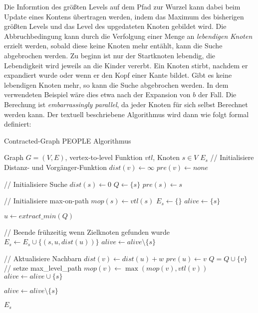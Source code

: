 Die Informtion des größten Levels auf dem Pfad zur Wurzel kann dabei beim Update eines Kontens übertragen werden, indem das Maximum des bisherigen größten Levels und das Level des upgedateten Knoten gebildet wird.
Die Abbruchbedingung kann durch die Verfolgung einer Menge an \emph{lebendigen Knoten} erzielt werden, sobald diese keine Knoten mehr entählt, kann die Suche abgebrochen werden.
Zu beginn ist nur der Startknoten lebendig, die Lebendigkeit wird jeweils an die Kinder vererbt.
Ein Knoten stirbt, nachdem er expandiert wurde oder wenn er den Kopf einer Kante bildet.
Gibt es keine lebendigen Knoten mehr, so kann die Suche abgebrochen werden.
In dem verwendeten Beispiel wäre dies etwa nach der Expansion von $b$ der Fall.
Die Berechung ist \emph{embarrassingly parallel}, da jeder Knoten für sich selbst Berechnet werden kann.
Der textuell beschriebene Algorithmus wird dann wie folgt formal definiert:

\begin{algorithm}[ht]
  \caption{Contracted-Graph PEOPLE Algorithmus}
  \begin{algorithmic}[1]
    \Require Graph $G = (V, E)$, vertex-to-level Funktion ${vtl}$, Knoten $s \in V$
    \Ensure $E_s$
    \State // Initialisiere Distanz- und Vorgänger-Funktion
    \State ${dist}(v) \leftarrow \infty$
    \State ${pre}(v) \leftarrow {none}$
    \EndFor

    \State
    \State // Initialisiere Suche
    \State ${dist}(s) \leftarrow 0$
    \State $Q\leftarrow \{ s \}$
    \State ${pre}(s) \leftarrow s$

    \State
    \State // Initialisiere max-on-path
    \State ${mop}(s) \leftarrow {vtl}(s)$
    \State $E_s \leftarrow \{ \}$
    \State ${alive} \leftarrow \{ s \}$

    \State
    \State $u \leftarrow{extract\_min}(Q)$\label{graphs:dijkstra:pop}

    \State
    \State // Beende frühzeitig wenn Zielknoten gefunden wurde
    \State $E_s \leftarrow E_s \cup \{ (s, u, {dist}(u)) \}$
    \State ${alive} \leftarrow {alive} \setminus \{ s \}$
    \EndIf

    \State
    \State // Aktualisiere Nachbarn
    \State ${dist}(v) \leftarrow {dist}(u) + w$
    \State ${pre}(u) \leftarrow v$
    \State $Q = Q \cup \{ v \}$
    \State
    \State // setze max\_level\_path
    \State ${mop}(v) \leftarrow \max({mop}(v), {vtl}(v))$
    \State ${alive} \leftarrow {alive} \cup \{ s \}$
    \EndIf
    \EndIf
    \EndFor

    \State ${alive} \leftarrow {alive} \setminus \{ s \}$

    \EndWhile

    \State
    \State \Return $E_s$
  \end{algorithmic}
\end{algorithm}


